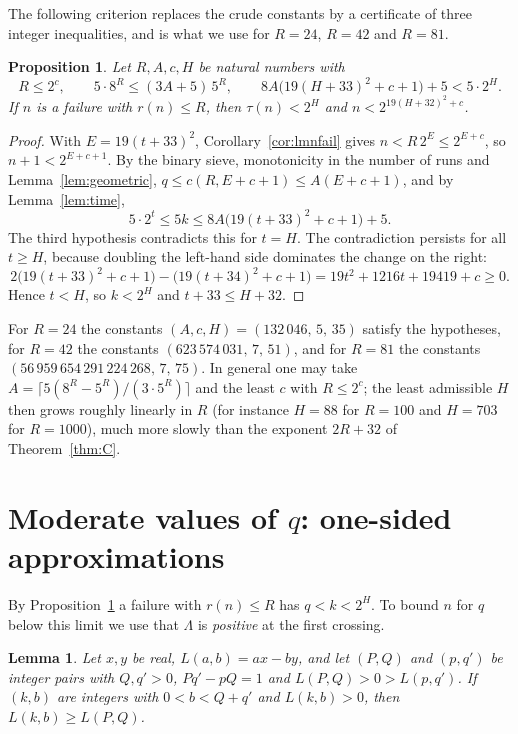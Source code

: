 \documentclass[11pt]{amsart}
\newtheorem{lemma}[theorem]{Lemma}
\newtheorem{proposition}[theorem]{Proposition}
\theoremstyle{definition}
\theoremstyle{remark}
\begin{document}
The following criterion replaces the crude constants by a certificate of three integer inequalities, and is what we use for $R=24$, $R=42$ and $R=81$.

\begin{proposition}\label{prop:tail}
Let $R,A,c,H$ be natural numbers with
\[
R\le2^{c},\qquad 5\cdot8^{R}\le(3A+5)\,5^{R},\qquad 8A\bigl(19(H+33)^{2}+c+1\bigr)+5<5\cdot2^{H}.
\]
If $n$ is a failure with $r(n)\le R$, then $\tau(n)<2^{H}$ and $n<2^{19(H+32)^{2}+c}$.
\end{proposition}

\begin{proof}
With $E=19(t+33)^{2}$, Corollary~\ref{cor:lmnfail} gives $n<R\,2^{E}\le2^{E+c}$, so $n+1<2^{E+c+1}$. By the binary sieve, monotonicity in the number of runs and Lemma~\ref{lem:geometric}, $q\le c(R,E+c+1)\le A(E+c+1)$, and by Lemma~\ref{lem:time},
\[
5\cdot2^{t}\le5k\le8A\bigl(19(t+33)^{2}+c+1\bigr)+5 .
\]
The third hypothesis contradicts this for $t=H$. The contradiction persists for all $t\ge H$, because doubling the left-hand side dominates the change on the right:
\[
2\bigl(19(t+33)^{2}+c+1\bigr)-\bigl(19(t+34)^{2}+c+1\bigr)=19t^{2}+1216t+19419+c\ge0 .
\]
Hence $t<H$, so $k<2^{H}$ and $t+33\le H+32$.
\end{proof}

For $R=24$ the constants $(A,c,H)=(132\,046,\,5,\,35)$ satisfy the hypotheses, for $R=42$ the constants $(623\,574\,031,\,7,\,51)$, and for $R=81$ the constants $(56\,959\,654\,291\,224\,268,\,7,\,75)$. In general one may take $A=\lceil5(8^{R}-5^{R})/(3\cdot5^{R})\rceil$ and the least $c$ with $R\le2^{c}$; the least admissible $H$ then grows roughly linearly in $R$ (for instance $H=88$ for $R=100$ and $H=703$ for $R=1000$), much more slowly than the exponent $2R+32$ of Theorem~\ref{thm:C}.

\section{Moderate values of \texorpdfstring{$q$}{q}: one-sided approximations}\label{sec:moderate}

By Proposition~\ref{prop:tail} a failure with $r(n)\le R$ has $q<k<2^{H}$. To bound $n$ for $q$ below this limit we use that $\Lambda$ is \emph{positive} at the first crossing.

\begin{lemma}\label{lem:onesided}
Let $x,y$ be real, $L(a,b)=ax-by$, and let $(P,Q)$ and $(p,q')$ be integer pairs with $Q,q'>0$, $Pq'-pQ=1$ and $L(P,Q)>0>L(p,q')$. If $(k,b)$ are integers with $0<b<Q+q'$ and $L(k,b)>0$, then $L(k,b)\ge L(P,Q)$.
\end{lemma}
\end{document}
